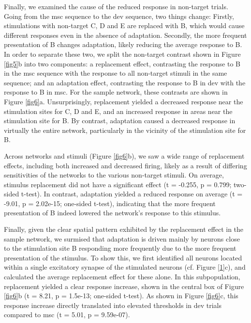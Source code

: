 \documentclass[pdflatex,referee,iicol,sn-basic]{sn-jnl}
\theoremstyle{thmstyleone}%
\theoremstyle{thmstyletwo}%
\theoremstyle{thmstylethree}%
\begin{document}
Finally, we examined the cause of the reduced response in non-target trials. Going from the msc sequence to the dev sequence, two things change: Firstly, stimulations with non-target C, D and E are replaced with B, which would cause different responses even in the absence of adaptation. Secondly, the more frequent presentation of B changes adaptation, likely reducing the average response to B.
In order to separate these two, we split the non-target contrast shown in Figure \ref{fig5}b into two components: a replacement effect, contrasting the response to B in the msc sequence with the response to all non-target stimuli in the same sequence; and an adaptation effect, contrasting the response to B in dev with the response to B in msc. For the sample network, these contrasts are shown in Figure \ref{fig6}a. Unsurprisingly, replacement yielded a decreased response near the stimulation sites for C, D and E, and an increased response in areas near the stimulation site for B. By contrast, adaptation caused a decreased response in virtually the entire network, particularly in the vicinity of the stimulation site for B.

Across networks and stimuli (Figure \ref{fig6}b), we saw a wide range of replacement effects, including both increased and decreased firing, likely as a result of differing sensitivities of the networks to the various non-target stimuli. On average, stimulus replacement did not have a significant effect (t = -0.255, p = 0.799; two-sided t-test). In contrast, adaptation yielded a reduced response on average (t = -9.01, p = 2.02e-15; one-sided t-test), indicating that the more frequent presentation of B indeed lowered the network's response to this stimulus.

Finally, given the clear spatial pattern exhibited by the replacement effect in the sample network, we surmised that adaptation is driven mainly by neurons close to the stimulation site B responding more frequently due to the more frequent presentation of the stimulus. To show this, we first identified all neurons located within a single excitatory synapse of the stimulated neurons (cf. Figure \ref{1}c), and calculated the average replacement effect for these alone. In this subpopulation, replacement yielded a clear response increase, shown in the central box of Figure \ref{fig6}b (t = 8.21, p = 1.5e-13; one-sided t-test). As shown in Figure \ref{fig6}c, this response increase directly translated into elevated thresholds in dev trials compared to msc (t = 5.01, p = 9.59e-07).
\end{document}
